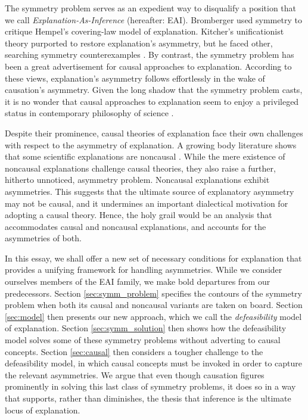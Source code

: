 \documentclass[natbib]{svjour3}                     %
\begin{document}
The symmetry problem serves as an expedient way to disqualify a position that we call \textit{Explanation-As-Inference} (hereafter: EAI). Bromberger \citeyearpar{Bromberger1965} used symmetry to critique Hempel's covering-law model of explanation. Kitcher's  \citep{Kitcher1989} unificationist theory purported to restore explanation's asymmetry, but he faced other, searching symmetry counterexamples \citep[see][]{Barnes1992}. By contrast, the symmetry problem has been a great advertisement for causal approaches to explanation. According to these views, explanation's asymmetry follows effortlessly in the wake of causation's asymmetry. Given the long shadow that the symmetry problem casts, it is no wonder that causal approaches to explanation seem to enjoy a privileged status in contemporary philosophy of science \citep{Strevens2008,Woodward2003}.

Despite their prominence, causal theories of explanation face their own challenges with respect to the asymmetry of explanation. A growing body literature shows that some scientific explanations are noncausal \cite{Reutlinger2017}. While the mere existence of noncausal explanations challenge causal theories, they also raise a further, hitherto unnoticed, asymmetry problem. Noncausal explanations exhibit asymmetries. This suggests that the ultimate source of explanatory asymmetry may not be causal, and it undermines an important dialectical motivation for adopting a causal theory. Hence, the holy grail would be an analysis that accommodates causal and noncausal explanations, and accounts for the asymmetries of both.

In this essay, we shall offer a new set of necessary conditions for explanation that provides a unifying framework for handling asymmetries. While we consider ourselves members of the EAI family, we make bold departures from our predecessors. Section \ref{sec:symm_problem} specifies the contours of the symmetry problem when both its causal and noncausal variants are taken on board. Section \ref{sec:model} then presents our new approach, which we call the \textit{defeasibility} model of explanation. Section \ref{sec:symm_solution} then shows how the defeasibility model solves some of these symmetry problems without adverting to causal concepts. Section \ref{sec:causal} then considers a tougher challenge to the defeasibility model, in which causal concepts must be invoked in order to capture the relevant asymmetries. We argue that even though causation figures prominently in solving this last class of symmetry problems, it does so in a way that supports, rather than diminishes, the thesis that inference is the ultimate locus of explanation.
\end{document}
